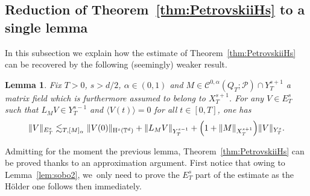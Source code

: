 \documentclass[10pt]{amsart}
\newtheorem{lem}[prop]{Lemma}
\theoremstyle{definition}
\newcommand\T{\mathbb{T}}
\renewcommand\H{\mathrm{H}}
\begin{document}
\subsection{Reduction of Theorem~\ref{thm:PetrovskiiHs} to a single lemma}\label{subsec:redlip}
In this subsection we explain how the estimate of Theorem~\ref{thm:PetrovskiiHs} can be recovered by the following (seemingly) weaker result.
\begin{lem}\label{lem:goalL2:weak}
Fix $T>0$, $s>d/2$, $\alpha\in(0,1)$ and $M\in\mathscr{C}^{0,\alpha}(Q_T;\mathscr{P})\cap Y_T^{s+1}$ a matrix field which is furthermore assumed to belong to $X_T^{s+1}$. For any $V\in E_T^s$ such that $L_M V\in Y_T^{s-1}$ and $\langle V(t)\rangle = 0$ for all $t\in[0,T]$, one has
\[
\|V\|_{E_T^s} \lesssim_{T,[M]_\alpha} \|V(0)\|_{\H^s(\T^d)} + \| L_M V \|_{Y_T^{s-1}} + \Bigl(1+\|M\|_{X^{s+1}_T}\Bigr)\|V\|_{Y_T^s}.
\]
\end{lem}
Admitting for the moment the previous lemma, Theorem~\ref{thm:PetrovskiiHs} can be proved thanks to an approximation argument. First notice that owing to Lemma~\ref{lem:sobo2}, we~only need to prove the $E_T^s$ part of the estimate as the Hölder one follows then immediately.
\end{document}
